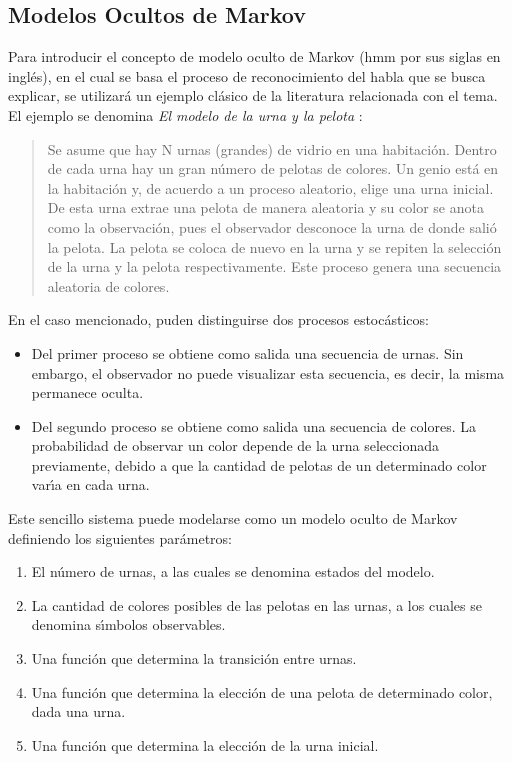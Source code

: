 \subsection{Modelos Ocultos de Markov}
\label{sec:hmm}

Para introducir el concepto de modelo oculto de Markov (\gls{hmm} por sus siglas en ingl\'es), 
en el cual se basa el proceso de reconocimiento del habla que se busca explicar, 
se utilizar\'a un ejemplo cl\'asico de la literatura relacionada con el tema.
El ejemplo se denomina \emph{El modelo de la urna y la pelota} \cite{Rabiner89atutorial}:

\begin{quote}
	Se asume que hay N urnas (grandes) de vidrio en una habitaci\'on. Dentro de cada urna hay un gran 
	n\'umero de pelotas de colores.
	Un genio est\'a en la habitaci\'on y, de acuerdo a un proceso aleatorio, elige una urna inicial. 
	De esta urna extrae una pelota de manera aleatoria y su color se anota como la observaci\'on, 
	pues el observador desconoce la urna de donde sali\'o la pelota.
	La pelota se coloca de nuevo en la urna y se repiten la selecci\'on de la urna y la pelota respectivamente.
	Este proceso genera una secuencia aleatoria de colores.
\end{quote}

En el caso mencionado, puden distinguirse dos procesos estoc\'asticos:
\begin{itemize}
	\item Del primer proceso se obtiene como salida una secuencia de urnas. Sin embargo, el observador
	no puede visualizar esta secuencia, es decir, la misma permanece oculta.
	\item Del segundo proceso se obtiene como salida una secuencia de colores. La probabilidad de observar
	un color depende de la urna seleccionada previamente, debido a que la cantidad de pelotas de un determinado
	color var{\'\i}a en cada urna.
\end{itemize}

Este sencillo sistema puede modelarse como un modelo oculto de Markov definiendo los siguientes par\'ametros:
\begin{enumerate}
	\item El n\'umero de urnas, a las cuales se denomina estados del modelo.
	\item La cantidad de colores posibles de las pelotas en las urnas, a los cuales se 
	denomina s{\'\i}mbolos observables.
	\item Una funci\'on que determina la transici\'on entre urnas.
	\item Una funci\'on que determina la elecci\'on de una pelota de determinado color, dada una urna.
	\item Una funci\'on que determina la elecci\'on de la urna inicial.
\end{enumerate}

